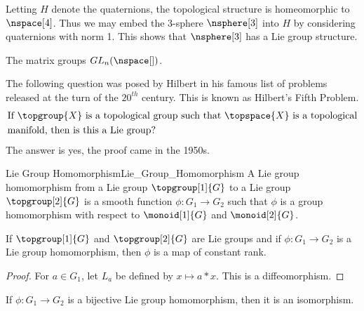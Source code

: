\documentclass[oneside]{book}                                                  %
\begin{document}
        \begin{example}
            Letting $H$ denote the quaternions, the topological structure is
            homeomorphic to $\nspace[4]$. Thus we may embed the 3-sphere
            $\nsphere[3]$ into $H$ by considering quaternions with norm 1. This
            shows that $\nsphere[3]$ has a Lie group structure.
        \end{example}
        \begin{example}
            The matrix groups $GL_{n}(\nspace[])$.
        \end{example}
        The following question was posed by Hilbert in his famous list of
        problems released at the turn of the $20^{th}$ century. This is known as
        Hilbert's Fifth Problem.
        \begin{equation}
            \begin{split}
                &\text{If }\topgroup{X}\text{ is a topological group such that }
                \topspace{X}\text{ is a topological}\\
                &\text{manifold, then is this a Lie group?}
            \end{split}
        \end{equation}
        The answer is yes, the proof came in the 1950s.
        \begin{fdefinition}{Lie Group Homomorphism}{Lie_Group_Homomorphism}
            A Lie group homomorphism from a Lie group
            $\topgroup[1]{G}$ to a Lie group $\topgroup[2]{G}$ is a smooth
            function $\phi:G_{1}\rightarrow{G}_{2}$ such that $\phi$ is a
            group homomorphism with respect to $\monoid[1]{G}$ and
            $\monoid[2]{G}$.
        \end{fdefinition}
        \begin{theorem}
            If $\topgroup[1]{G}$ and $\topgroup[2]{G}$ are Lie groups and if
            $\phi:G_{1}\rightarrow{G}_{2}$ is a Lie group homomorphism, then
            $\phi$ is a map of constant rank.
        \end{theorem}
        \begin{proof}
            For $a\in{G}_{1}$, let $L_{a}$ be defined by $x\mapsto{a}*x$. This
            is a diffeomorphism.
        \end{proof}
        \begin{theorem}
            If $\phi:G_{1}\rightarrow{G}_{2}$ is a bijective Lie group
            homomorphism, then it is an isomorphism.
        \end{theorem}
\end{document}
